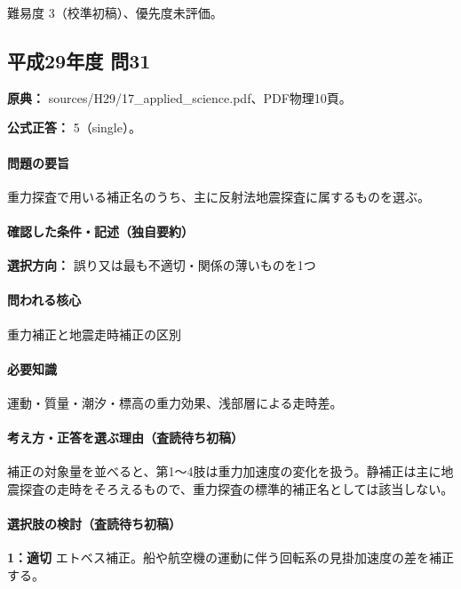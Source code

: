 \par 難易度 3（校準初稿）、優先度未評価。

\subsection{平成29年度 問31}
\label{q:h29-reg-applied-31}

\noindent\textbf{原典：} sources/H29/17\_applied\_science.pdf、PDF物理10頁。

\textbf{公式正答：} 5（single）。

\paragraph{問題の要旨} 重力探査で用いる補正名のうち、主に反射法地震探査に属するものを選ぶ。

\paragraph{確認した条件・記述（独自要約）}\mbox{}\par

\noindent\textbf{選択方向：} 誤り又は最も不適切・関係の薄いものを1つ\par

\paragraph{問われる核心} 重力補正と地震走時補正の区別

\paragraph{必要知識} 運動・質量・潮汐・標高の重力効果、浅部層による走時差。

\paragraph{考え方・正答を選ぶ理由（査読待ち初稿）} 補正の対象量を並べると、第1〜4肢は重力加速度の変化を扱う。静補正は主に地震探査の走時をそろえるもので、重力探査の標準的補正名としては該当しない。

\paragraph{選択肢の検討（査読待ち初稿）}\mbox{}\par

\noindent\textbf{1：適切} エトベス補正。船や航空機の運動に伴う回転系の見掛加速度の差を補正する。\par

